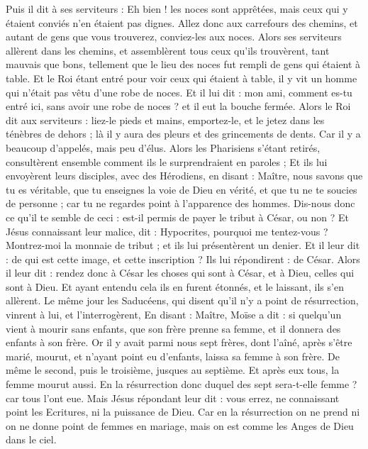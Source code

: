 \begin{multicols}{2}
Puis il dit à ses serviteurs : Eh bien ! les noces sont apprêtées, mais ceux qui y étaient conviés n'en étaient pas dignes.
Allez donc aux carrefours des chemins, et autant de gens que vous trouverez, conviez-les aux noces.
Alors ses serviteurs allèrent dans les chemins, et assemblèrent tous ceux qu'ils trouvèrent, tant mauvais que bons, tellement que le lieu des noces fut rempli de gens qui étaient à table.
Et le Roi étant entré pour voir ceux qui étaient à table, il y vit un homme qui n'était pas vêtu d'une robe de noces.
Et il lui dit : mon ami, comment es-tu entré ici, sans avoir une robe de noces ? et il eut la bouche fermée.
Alors le Roi dit aux serviteurs : liez-le pieds et mains, emportez-le, et le jetez dans les ténèbres de dehors ; là il y aura des pleurs et des grincements de dents.
Car il y a beaucoup d'appelés, mais peu d'élus.
Alors les Pharisiens s'étant retirés, consultèrent ensemble comment ils le surprendraient en paroles ;
Et ils lui envoyèrent leurs disciples, avec des Hérodiens, en disant : Maître, nous savons que tu es véritable, que tu enseignes la voie de Dieu en vérité, et que tu ne te soucies de personne ; car tu ne regardes point à l'apparence des hommes.
Dis-nous donc ce qu'il te semble de ceci : est-il permis de payer le tribut à César, ou non ?
Et Jésus connaissant leur malice, dit : Hypocrites, pourquoi me tentez-vous ?
Montrez-moi la monnaie de tribut ; et ils lui présentèrent un denier.
Et il leur dit : de qui est cette image, et cette inscription ?
Ils lui répondirent : de César. Alors il leur dit : rendez donc à César les choses qui sont à César, et à Dieu, celles qui sont à Dieu.
Et ayant entendu cela ils en furent étonnés, et le laissant, ils s'en allèrent.
Le même jour les Saducéens, qui disent qu'il n'y a point de résurrection, vinrent à lui, et l'interrogèrent,
En disant : Maître, Moïse a dit : si quelqu'un vient à mourir sans enfants, que son frère prenne sa femme, et il donnera des enfants à son frère.
Or il y avait parmi nous sept frères, dont l'aîné, après s'être marié, mourut, et n'ayant point eu d'enfants, laissa sa femme à son frère.
De même le second, puis le troisième, jusques au septième.
Et après eux tous, la femme mourut aussi.
En la résurrection donc duquel des sept sera-t-elle femme ? car tous l'ont eue.
Mais Jésus répondant leur dit : vous errez, ne connaissant point les Ecritures, ni la puissance de Dieu.
Car en la résurrection on ne prend ni on ne donne point de femmes en mariage, mais on est comme les Anges de Dieu dans le ciel.

\end{multicols}
